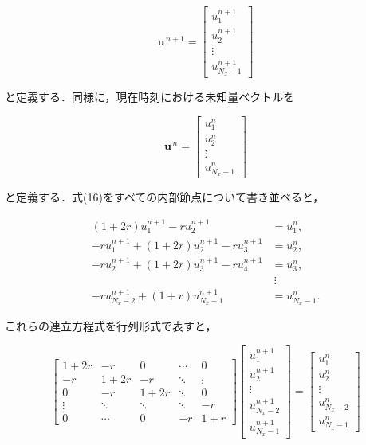 \documentclass[dvipdfmx]{jsarticle}
\begin{document}
\[
\mathbf{u}^{\,n+1}
=
\begin{bmatrix}
u_1^{n+1}\\
u_2^{n+1}\\
\vdots\\
u_{N_x-1}^{n+1}
\end{bmatrix}
\]

と定義する．同様に，現在時刻における未知量ベクトルを

\[
\mathbf{u}^{\,n}
=
\begin{bmatrix}
u_1^{n}\\
u_2^{n}\\
\vdots\\
u_{N_x-1}^{n}
\end{bmatrix}
\]

と定義する．式(16)をすべての内部節点について書き並べると，

\[
\begin{aligned}
(1+2r)u_1^{n+1}-ru_2^{n+1}
&=u_1^n,\\
-r u_1^{n+1}
+(1+2r)u_2^{n+1}
-r u_3^{n+1}
&=u_2^n,\\
-r u_2^{n+1}
+(1+2r)u_3^{n+1}
-r u_4^{n+1}
&=u_3^n,\\
&\ \vdots\\
-r u_{N_x-2}^{n+1}
+(1+r)u_{N_x-1}^{n+1}
&=u_{N_x-1}^n.
\end{aligned}
\]

これらの連立方程式を行列形式で表すと，

\[
\begin{bmatrix}
1+2r & -r    & 0     & \cdots & 0\\
-r   & 1+2r  & -r    & \ddots & \vdots\\
0    & -r    & 1+2r  & \ddots & 0\\
\vdots & \ddots & \ddots & \ddots & -r\\
0 & \cdots & 0 & -r & 1+r
\end{bmatrix}
\begin{bmatrix}
u_1^{n+1}\\
u_2^{n+1}\\
\vdots\\
u_{N_x-2}^{n+1}\\
u_{N_x-1}^{n+1}
\end{bmatrix}
=
\begin{bmatrix}
u_1^{n}\\
u_2^{n}\\
\vdots\\
u_{N_x-2}^{n}\\
u_{N_x-1}^{n}
\end{bmatrix}
\tag{28}
\]
\end{document}
